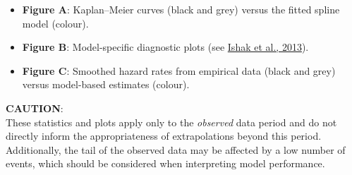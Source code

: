 \documentclass[
]{article}
\providecommand{\tightlist}{%
  \setlength{\itemsep}{0pt}\setlength{\parskip}{0pt}}
\begin{document}
\begin{itemize}
\tightlist
\item
  \textbf{Figure A}: Kaplan--Meier curves (black and grey) versus the
  fitted spline model (colour).\\
\item
  \textbf{Figure B}: Model-specific diagnostic plots (see
  \href{https://doi.org/10.1007/s40273-013-0064-3}{Ishak et al.,
  2013}).\\
\item
  \textbf{Figure C}: Smoothed hazard rates from empirical data (black
  and grey) versus model-based estimates (colour).
\end{itemize}

\textbf{CAUTION}:\\
These statistics and plots apply only to the \emph{observed} data period
and do not directly inform the appropriateness of extrapolations beyond
this period.\\
Additionally, the tail of the observed data may be affected by a low
number of events, which should be considered when interpreting model
performance.

\clearpage
\end{document}
